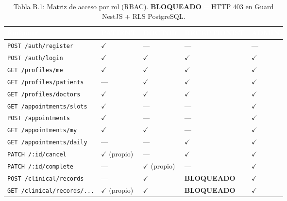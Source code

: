 \documentclass[a4paper,12pt]{article}
\renewcommand{\arraystretch}{1.1}
\begin{document}
\begin{table}[H]
\centering
\small
\renewcommand{\arraystretch}{1.5}
\setlength{\tabcolsep}{3pt}
\begin{tabular}{|p{3.8cm}|>{\centering\arraybackslash}p{2.2cm}|>{\centering\arraybackslash}p{2.0cm}|>{\centering\arraybackslash}p{3.0cm}|>{\centering\arraybackslash}p{2.0cm}|}
\hline
\rowcolor{SKTPrimary}
\textcolor{white}{\textbf{Endpoint}} &
\textcolor{white}{\textbf{PATIENT}} &
\textcolor{white}{\textbf{DOCTOR}} &
\textcolor{white}{\textbf{RECEPTIONIST}} &
\textcolor{white}{\textbf{ADMIN}} \\
\hline
\texttt{POST /auth/register}         & $\checkmark$ & ---          & ---                  & ---           \\ \hline
\texttt{POST /auth/login}            & $\checkmark$ & $\checkmark$ & $\checkmark$         & $\checkmark$  \\ \hline
\texttt{GET /profiles/me}            & $\checkmark$ & $\checkmark$ & $\checkmark$         & $\checkmark$  \\ \hline
\texttt{GET /profiles/patients}      & ---          & $\checkmark$ & $\checkmark$         & $\checkmark$  \\ \hline
\texttt{GET /profiles/doctors}       & $\checkmark$ & $\checkmark$ & $\checkmark$         & $\checkmark$  \\ \hline
\texttt{GET /appointments/slots}     & $\checkmark$ & ---          & ---                  & $\checkmark$  \\ \hline
\texttt{POST /appointments}          & $\checkmark$ & ---          & ---                  & $\checkmark$  \\ \hline
\texttt{GET /appointments/my}        & $\checkmark$ & $\checkmark$ & ---                  & $\checkmark$  \\ \hline
\texttt{GET /appointments/daily}     & ---          & ---          & $\checkmark$         & $\checkmark$  \\ \hline
\texttt{PATCH /:id/cancel}           & $\checkmark$ {\scriptsize(propio)} & --- & $\checkmark$  & $\checkmark$  \\ \hline
\texttt{PATCH /:id/complete}         & ---          & $\checkmark$ {\scriptsize(propio)} & ---      & $\checkmark$  \\ \hline
\texttt{POST /clinical/records}      & ---          & $\checkmark$ & \textbf{BLOQUEADO}   & $\checkmark$  \\ \hline
\texttt{GET /clinical/records/...}   & $\checkmark$ {\scriptsize(propio)} & $\checkmark$ & \textbf{BLOQUEADO} & $\checkmark$ \\ \hline
\end{tabular}
\caption*{Tabla B.1: Matriz de acceso por rol (RBAC). \textbf{BLOQUEADO} = HTTP 403 en Guard NestJS + RLS PostgreSQL.}
\end{table}
\end{document}
